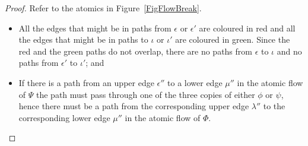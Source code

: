 \begin{proof}
Refer to the atomics in Figure~\ref{FigFlowBreak}.
\begin{itemize}
	\item All the edges that might be in paths from $\epsilon$ or $\epsilon'$ are coloured in red and all the edges that might be in paths to $\iota$ or $\iota'$ are coloured in green. Since the red and the green paths do not overlap, there are no paths from $\epsilon$ to $\iota$ and no paths from $\epsilon'$ to $\iota'$; and
	\item If there is a path from an upper edge $\epsilon''$ to a lower edge $\mu''$ in the atomic flow of $\Psi$ the path must pass through one of the three copies of either $\phi$ or $\psi$, hence there must be a path from the corresponding upper edge $\lambda''$ to the corresponding lower edge $\mu''$ in the atomic flow of $\Phi$.
\end{itemize}
\end{proof}
